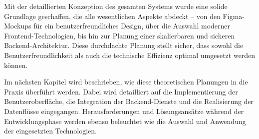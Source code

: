 Mit der detaillierten Konzeption des gesamten Systems wurde eine solide Grundlage geschaffen, die alle wesentlichen Aspekte abdeckt – von den Figma-Mockups für ein benutzerfreundliches Design, über die Auswahl moderner Frontend-Technologien, bis hin zur Planung einer skalierbaren und sicheren Backend-Architektur. Diese durchdachte Planung stellt sicher, dass sowohl die Benutzerfreundlichkeit als auch die technische Effizienz optimal umgesetzt werden können.

Im nächsten Kapitel wird beschrieben, wie diese theoretischen Planungen in die Praxis überführt werden. Dabei wird detailliert auf die Implementierung der Benutzeroberfläche, die Integration der Backend-Dienste und die Realisierung der Datenflüsse eingegangen. Herausforderungen und Lösungsansätze während der Entwicklungsphase werden ebenso beleuchtet wie die Auswahl und Anwendung der eingesetzten Technologien.
